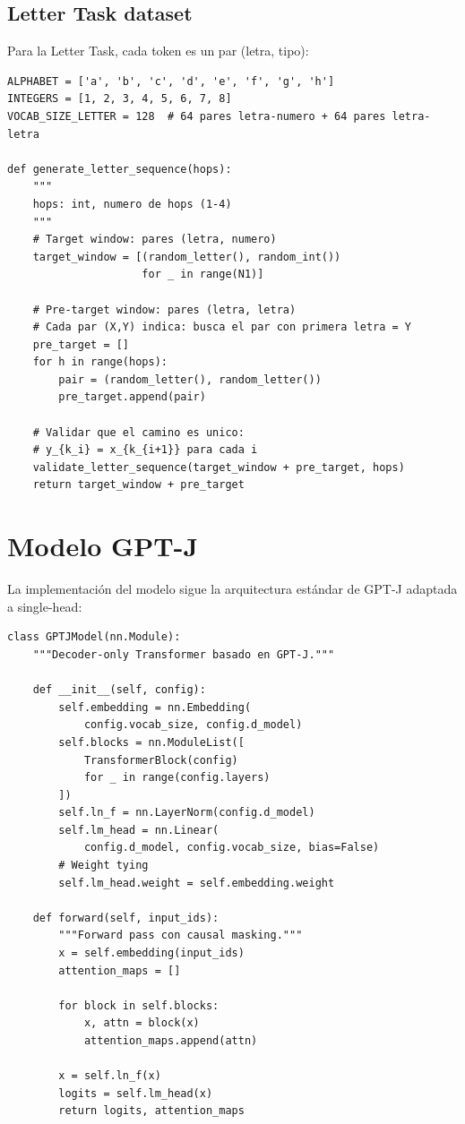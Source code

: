 \documentclass[12pt,a4paper,oneside]{report}
\begin{document}
\subsection{Letter Task dataset}

Para la Letter Task, cada token es un par (letra, tipo):

\begin{lstlisting}
ALPHABET = ['a', 'b', 'c', 'd', 'e', 'f', 'g', 'h']
INTEGERS = [1, 2, 3, 4, 5, 6, 7, 8]
VOCAB_SIZE_LETTER = 128  # 64 pares letra-numero + 64 pares letra-letra

def generate_letter_sequence(hops):
    """
    hops: int, numero de hops (1-4)
    """
    # Target window: pares (letra, numero)
    target_window = [(random_letter(), random_int())
                     for _ in range(N1)]

    # Pre-target window: pares (letra, letra)
    # Cada par (X,Y) indica: busca el par con primera letra = Y
    pre_target = []
    for h in range(hops):
        pair = (random_letter(), random_letter())
        pre_target.append(pair)

    # Validar que el camino es unico:
    # y_{k_i} = x_{k_{i+1}} para cada i
    validate_letter_sequence(target_window + pre_target, hops)
    return target_window + pre_target
\end{lstlisting}

\section{Modelo GPT-J}

La implementación del modelo sigue la arquitectura estándar de GPT-J adaptada a single-head:

\begin{lstlisting}
class GPTJModel(nn.Module):
    """Decoder-only Transformer basado en GPT-J."""

    def __init__(self, config):
        self.embedding = nn.Embedding(
            config.vocab_size, config.d_model)
        self.blocks = nn.ModuleList([
            TransformerBlock(config)
            for _ in range(config.layers)
        ])
        self.ln_f = nn.LayerNorm(config.d_model)
        self.lm_head = nn.Linear(
            config.d_model, config.vocab_size, bias=False)
        # Weight tying
        self.lm_head.weight = self.embedding.weight

    def forward(self, input_ids):
        """Forward pass con causal masking."""
        x = self.embedding(input_ids)
        attention_maps = []

        for block in self.blocks:
            x, attn = block(x)
            attention_maps.append(attn)

        x = self.ln_f(x)
        logits = self.lm_head(x)
        return logits, attention_maps
\end{lstlisting}
\end{document}
